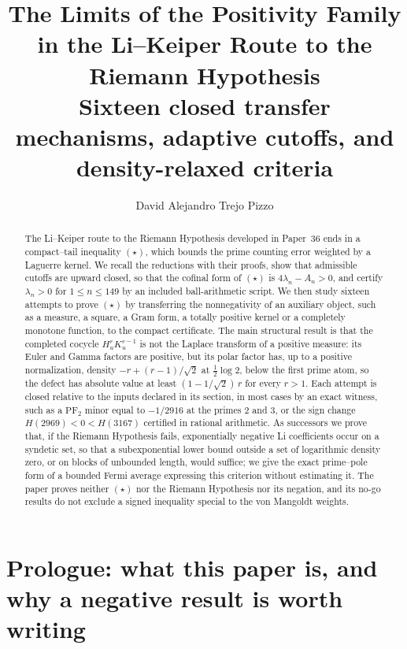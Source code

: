 \documentclass[11pt]{amsart}
\title[Limits of the positivity family]{The Limits of the Positivity Family in the
Li--Keiper Route to the Riemann Hypothesis\\[0.35em]
\normalsize\textmd{Sixteen closed transfer mechanisms, adaptive cutoffs, and
density-relaxed criteria}}
\author{David Alejandro Trejo Pizzo}
\theoremstyle{definition}
\theoremstyle{remark}
\theoremstyle{definition}
\begin{document}
\maketitle


\begin{abstract}
The Li--Keiper route to the Riemann Hypothesis developed in Paper~36 ends in a compact--tail
inequality $(\star)$, which bounds the prime counting error weighted by a Laguerre kernel. We
recall the reductions with their proofs, show that admissible cutoffs are upward closed, so that
the cofinal form of $(\star)$ is $4\lambda_n-A_n>0$, and certify $\lambda_n>0$ for
$1\le n\le149$ by an included ball-arithmetic script. We then study sixteen attempts to prove
$(\star)$ by transferring the nonnegativity of an auxiliary object, such as a measure, a square,
a Gram form, a totally positive kernel or a completely monotone function, to the compact
certificate. The main structural result is that the completed cocycle $H_u^rK_u^{r-1}$ is not
the Laplace transform of a positive measure: its Euler and Gamma factors are positive, but its
polar factor has, up to a positive normalization, density $-r+(r-1)/\sqrt2$ at
$\tfrac12\log2$, below the first prime atom, so the defect has absolute value at least
$(1-1/\sqrt2)\,r$ for every $r>1$. Each attempt is closed relative to the inputs declared in its
section, in most cases by an exact witness, such as a $\mathrm{PF}_2$ minor equal to
$-1/2916$ at the primes $2$ and $3$, or the sign change $H(2969)<0<H(3167)$ certified in
rational arithmetic. As successors we prove that, if the Riemann Hypothesis fails, exponentially
negative Li coefficients occur on a syndetic set, so that a subexponential lower bound outside a
set of logarithmic density zero, or on blocks of unbounded length, would suffice; we give the
exact prime--pole form of a bounded Fermi average expressing this criterion without estimating
it. The paper proves neither $(\star)$ nor the Riemann Hypothesis nor its negation, and its
no-go results do not exclude a signed inequality special to the von Mangoldt weights.
\end{abstract}

\tableofcontents
\newpage

\section{Prologue: what this paper is, and why a negative result is worth writing}
\label{sec:prologue}
\end{document}
